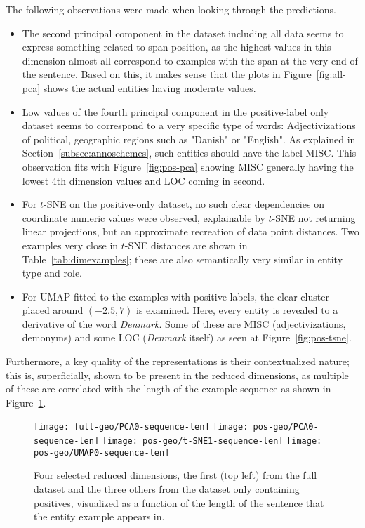 \documentclass[main.tex]{subfiles}
\begin{document}
The following observations were made when looking through the predictions.
\begin{itemize}
    \item
        The second principal component in the dataset including all data seems to express something related to span position, as the highest values in this dimension almost all correspond to examples with the span at the very end of the sentence.
        Based on this, it makes sense that the plots in Figure~\ref{fig:all-pca} shows the actual entities having moderate values.
    \item
        Low values of the fourth principal component in the positive-label only dataset seems to correspond to a very specific type of words:
        Adjectivizations of political, geographic regions such as "Danish" or "English".
        As explained in Section~\ref{subsec:annoschemes}, such entities should have the label MISC.
        This observation fits with Figure~\ref{fig:pos-pca} showing MISC generally having the lowest 4th dimension values and LOC coming in second.
    \item
        For $t$-SNE on the positive-only dataset, no such clear dependencies on coordinate numeric values were observed, explainable by $t$-SNE not returning linear projections, but an approximate recreation of data point distances.
        Two examples very close in $t$-SNE distances are shown in Table~\ref{tab:dimexamples}; these are also semantically very similar in entity type and role.
    \item
        For UMAP fitted to the examples with positive labels, the clear cluster placed around $\left( -2.5, 7\right)$ is examined.
        Here, every entity is revealed to a derivative of the word \emph{Denmark}.
        Some of these are MISC (adjectivizations, demonyms) and some LOC (\emph{Denmark} itself) as seen at Figure~\ref{fig:pos-tsne}.
\end{itemize}
Furthermore, a key quality of the representations is their contextualized nature; this is, superficially, shown to be present in the reduced dimensions, as multiple of these are correlated with the length of the example sequence as shown in Figure~\ref{fig:repvslen}.

\begin{figure}[H]
    \centering
        \texttt{[image: full-geo/PCA0-sequence-len]}
        \texttt{[image: pos-geo/PCA0-sequence-len]}
        \texttt{[image: pos-geo/t-SNE1-sequence-len]}
        \texttt{[image: pos-geo/UMAP0-sequence-len]}
     \caption{
        Four selected reduced dimensions, the first (top left) from the full dataset and the three others from the dataset only containing positives, visualized as a function of the length of the sentence that the entity example appears in.
    }
    \label{fig:repvslen}
\end{figure}\noindent
\end{document}
